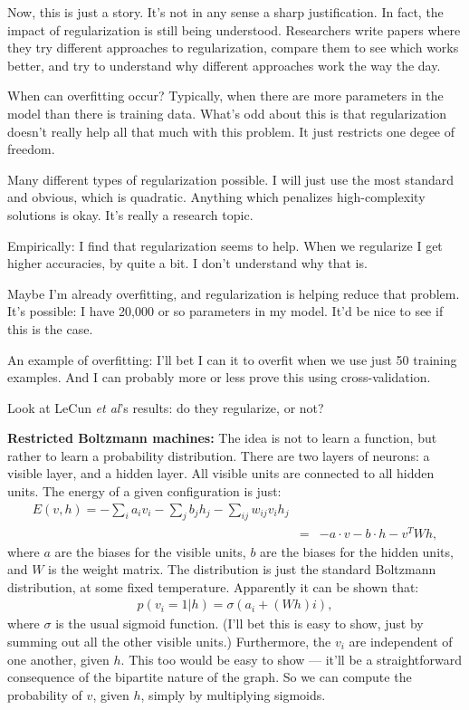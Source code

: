 \documentclass[12pt]{report}
\begin{document}
Now, this is just a story.  It's not in any sense a sharp
justification.  In fact, the impact of regularization is still being
understood.  Researchers write papers where they try different
approaches to regularization, compare them to see which works better,
and try to understand why different approaches work the way the day.

When can overfitting occur?  Typically, when there are more parameters
in the model than there is training data.  What's odd about this is
that regularization doesn't really help all that much with this
problem.  It just restricts one degee of freedom.

Many different types of regularization possible.  I will just use the
most standard and obvious, which is quadratic.  Anything which
penalizes high-complexity solutions is okay.  It's really a research
topic.

Empirically: I find that regularization seems to help.  When we
regularize I get higher accuracies, by quite a bit.  I don't
understand why that is.

Maybe I'm already overfitting, and regularization is helping reduce
that problem.  It's possible: I have 20,000 or so parameters in my
model.  It'd be nice to see if this is the case.

An example of overfitting: I'll bet I can it to overfit when we use
just 50 training examples.  And I can probably more or less prove this
using cross-validation.

Look at LeCun \emph{et al}'s results: do they regularize, or not?

\textbf{Restricted Boltzmann machines:} The idea is not to learn a
function, but rather to learn a probability distribution.  There are
two layers of neurons: a visible layer, and a hidden layer.  All
visible units are connected to all hidden units.  The energy of a
given configuration is just:
\begin{eqnarray}
  E(v, h) = -\sum_i a_i v_i-\sum_j b_j h_j-\sum_{ij} w_{ij} v_i h_j \\
  & = & -a \cdot v-b\cdot h -v^T W h,
\end{eqnarray}
where $a$ are the biases for the visible units, $b$ are the biases for
the hidden units, and $W$ is the weight matrix.  The distribution is
just the standard Boltzmann distribution, at some fixed temperature.
Apparently it can be shown that:
\begin{eqnarray}
  p(v_i = 1 | h) = \sigma( a_i + (Wh)i),
\end{eqnarray}
where $\sigma$ is the usual sigmoid function.  (I'll bet this is easy
to show, just by summing out all the other visible units.)
Furthermore, the $v_i$ are independent of one another, given $h$.
This too would be easy to show --- it'll be a straightforward
consequence of the bipartite nature of the graph. So we can compute
the probability of $v$, given $h$, simply by multiplying sigmoids.
\end{document}
